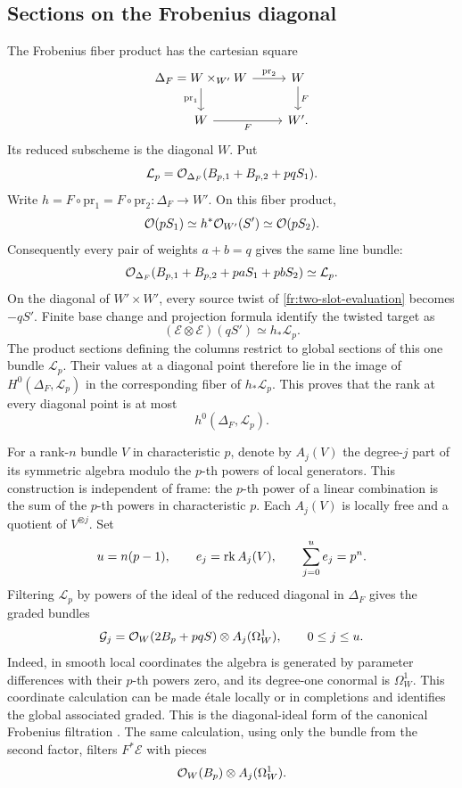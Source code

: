 \subsection{Sections on the Frobenius diagonal}
\label{fr:filtration}

The Frobenius fiber product has the cartesian square
\begin{equation}\label{fr:frobenius-square}
\begin{tikzcd}
 \Delta_F=W\times_{W'}W \arrow[r,"\mathrm{pr}_2"] \arrow[d,"\mathrm{pr}_1"'] & W \arrow[d,"F"]\\
 W \arrow[r,"F"'] & W'.
\end{tikzcd}
\end{equation}
Its reduced subscheme is the diagonal $W$.  Put
\[
 \mathcal L_p=
 \mathcal O_{\Delta_F}(B_{p,1}+B_{p,2}+pqS_1).
\]
Write $h=F\circ\mathrm{pr}_1=F\circ\mathrm{pr}_2:
\Delta_F\to W'$. On this fiber product,
\[
 \mathcal O(pS_1)\simeq h^*\mathcal O_{W'}(S')\simeq\mathcal O(pS_2).
\]
Consequently every pair of weights $a+b=q$ gives the same line bundle:
\[
 \mathcal O_{\Delta_F}(B_{p,1}+B_{p,2}+paS_1+pbS_2)
 \simeq\mathcal L_p.
\]
On the diagonal of $W'\times W'$, every source twist of
\eqref{fr:two-slot-evaluation} becomes $-qS'$.
Finite base change and projection formula identify the twisted target as
\[
 (\mathcal E\otimes\mathcal E)(qS')\simeq h_*\mathcal L_p.
\]
The product sections defining the columns restrict to global sections
of this one bundle $\mathcal L_p$. Their values at a diagonal point
therefore lie in the image of $H^0(\Delta_F,\mathcal L_p)$ in the
corresponding fiber of $h_*\mathcal L_p$. This proves that the rank
at every diagonal point is at most
\begin{equation}\label{fr:diagonal-rank-upper}
 h^0(\Delta_F,\mathcal L_p).
\end{equation}

For a rank-$n$ bundle $V$ in characteristic $p$, denote by $A_j(V)$
the degree-$j$ part of its symmetric algebra modulo the $p$-th powers
of local generators.  This construction is independent of frame:
the $p$-th power of a linear combination is the sum of the $p$-th
powers in characteristic $p$.  Each $A_j(V)$ is locally free and a
quotient of $V^{\otimes j}$.  Set
\[
 u=n(p-1),\qquad e_j=\operatorname{rk} A_j(V),\qquad
 \sum_{j=0}^u e_j=p^n.
\]
Filtering $\mathcal L_p$ by powers of the ideal of the reduced
diagonal in $\Delta_F$ gives the graded bundles
\begin{equation}\label{fr:diagonal-graded}
 \mathcal G_j=\mathcal O_W(2B_p+pqS)\otimes A_j(\Omega_W^1),
 \qquad 0\le j\le u.
\end{equation}
Indeed, in smooth local coordinates the algebra is generated by
parameter differences with their $p$-th powers zero, and its
degree-one conormal is $\Omega_W^1$.  This coordinate calculation
can be made étale locally or in completions and identifies the
global associated graded.  This is the diagonal-ideal form of the canonical Frobenius filtration
\cite[Corollary~3.5]{KS}. The same calculation, using
only the bundle from the second factor, filters $F^*\mathcal E$ with pieces
\cite[Theorem~3.7]{Sun}
\begin{equation}\label{fr:Frob-pullback-graded}
 \mathcal O_W(B_p)\otimes A_j(\Omega_W^1).
\end{equation}

